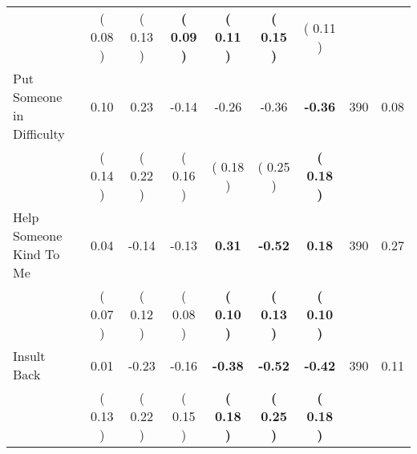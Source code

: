 \begin{tabular}{lcccccccc}
 & (     0.08 ) & (     0.13 ) & \textbf{(     0.09 )} & \textbf{(     0.11 )} & \textbf{(     0.15 )} & (     0.11 ) & \\
Put Someone in Difficulty &      0.10 &      0.23 &     -0.14 &     -0.26 &     -0.36 & \textbf{    -0.36} & 390 &       0.08 \\ 
 & (     0.14 ) & (     0.22 ) & (     0.16 ) & (     0.18 ) & (     0.25 ) & \textbf{(     0.18 )} & \\
Help Someone Kind To Me &      0.04 &     -0.14 &     -0.13 & \textbf{     0.31} & \textbf{    -0.52} & \textbf{     0.18} & 390 &       0.27 \\ 
 & (     0.07 ) & (     0.12 ) & (     0.08 ) & \textbf{(     0.10 )} & \textbf{(     0.13 )} & \textbf{(     0.10 )} & \\
Insult Back &      0.01 &     -0.23 &     -0.16 & \textbf{    -0.38} & \textbf{    -0.52} & \textbf{    -0.42} & 390 &       0.11 \\ 
 & (     0.13 ) & (     0.22 ) & (     0.15 ) & \textbf{(     0.18 )} & \textbf{(     0.25 )} & \textbf{(     0.18 )} & \\
\bottomrule
\end{tabular}
